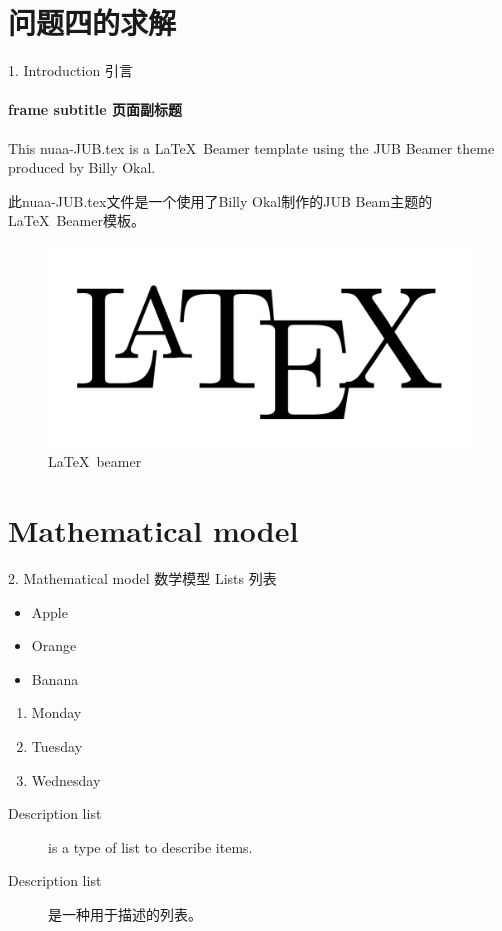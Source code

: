 \documentclass{beamer}
\begin{document}
  \section{问题四的求解}
  \begin{frame}{1. Introduction 引言}
    \framesubtitle{frame subtitle 页面副标题}
    This nuaa-JUB.tex is a \LaTeX \ Beamer template using the JUB Beamer theme  produced by Billy Okal.

    \bigskip

    此nuaa-JUB.tex文件是一个使用了Billy Okal制作的JUB Beam主题的\LaTeX \ Beamer模板。

    \begin{figure}
      \begin{center}
        \includegraphics[scale=0.1]{latex.png}
      \end{center}
      \caption{\LaTeX \ beamer}
      \label{Fig:latex_beamer}
    \end{figure}
  \end{frame} %

  \section{Mathematical model}
  \label{Sec:model}
  \begin{frame}{2. Mathematical model 数学模型}
    Lists 列表

    \begin{itemize}
    \item Apple
    \item Orange
    \item Banana
    \end{itemize}

    \begin{enumerate}
    \item Monday
    \item Tuesday
    \item Wednesday
    \end{enumerate}

    \begin{description}
    \item[Description list] is a type of list to describe items.
    \item[Description list] 是一种用于描述的列表。
    \end{description}
  \end{frame} 
\end{document}
